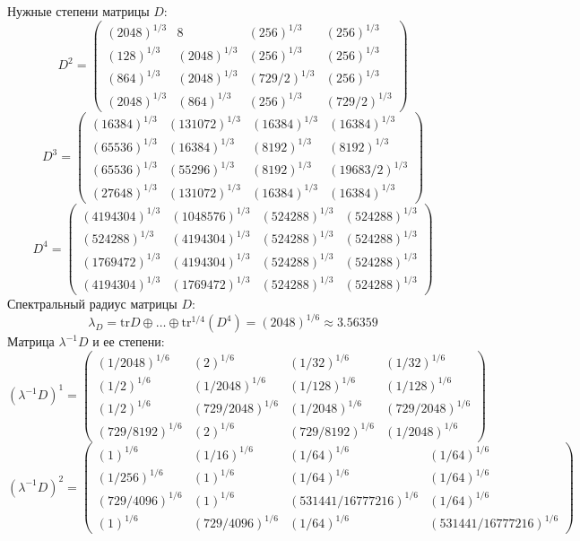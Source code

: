 Нужные степени матрицы $D$:
$$D^2 = \begin{pmatrix}
(2048)^{1/3} & 8 & (256)^{1/3} & (256)^{1/3}\\
(128)^{1/3} & (2048)^{1/3} & (256)^{1/3} & (256)^{1/3}\\
(864)^{1/3} & (2048)^{1/3} & (729/2)^{1/3} & (256)^{1/3}\\
(2048)^{1/3} & (864)^{1/3} & (256)^{1/3} & (729/2)^{1/3}
\end{pmatrix}
$$
$$D^3 = \begin{pmatrix}
(16384)^{1/3} & (131072)^{1/3} & (16384)^{1/3} & (16384)^{1/3}\\
(65536)^{1/3} & (16384)^{1/3} & (8192)^{1/3} & (8192)^{1/3}\\
(65536)^{1/3} & (55296)^{1/3} & (8192)^{1/3} & (19683/2)^{1/3}\\
(27648)^{1/3} & (131072)^{1/3} & (16384)^{1/3} & (16384)^{1/3}
\end{pmatrix}
$$
$$D^4 = \begin{pmatrix}
(4194304)^{1/3} & (1048576)^{1/3} & (524288)^{1/3} & (524288)^{1/3}\\
(524288)^{1/3} & (4194304)^{1/3} & (524288)^{1/3} & (524288)^{1/3}\\
(1769472)^{1/3} & (4194304)^{1/3} & (524288)^{1/3} & (524288)^{1/3}\\
(4194304)^{1/3} & (1769472)^{1/3} & (524288)^{1/3} & (524288)^{1/3}
\end{pmatrix}
$$
Спектральный радиус матрицы $D$:
$$\lambda_{D} = \mathrm{tr}D\oplus \dots \oplus \mathrm{tr}^{1/4}(D^{4}) = (2048)^{1/6} \approx 3.56359$$
Матрица $\lambda^{-1}D$ и ее степени:
$$(\lambda^{-1}D)^1 = \begin{pmatrix}
(1/2048)^{1/6} & (2)^{1/6} & (1/32)^{1/6} & (1/32)^{1/6}\\
(1/2)^{1/6} & (1/2048)^{1/6} & (1/128)^{1/6} & (1/128)^{1/6}\\
(1/2)^{1/6} & (729/2048)^{1/6} & (1/2048)^{1/6} & (729/2048)^{1/6}\\
(729/8192)^{1/6} & (2)^{1/6} & (729/8192)^{1/6} & (1/2048)^{1/6}
\end{pmatrix}
$$
$$(\lambda^{-1}D)^2 = \begin{pmatrix}
(1)^{1/6} & (1/16)^{1/6} & (1/64)^{1/6} & (1/64)^{1/6}\\
(1/256)^{1/6} & (1)^{1/6} & (1/64)^{1/6} & (1/64)^{1/6}\\
(729/4096)^{1/6} & (1)^{1/6} & (531441/16777216)^{1/6} & (1/64)^{1/6}\\
(1)^{1/6} & (729/4096)^{1/6} & (1/64)^{1/6} & (531441/16777216)^{1/6}
\end{pmatrix}
$$
